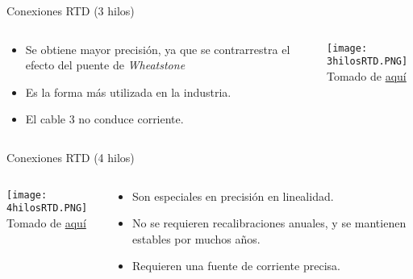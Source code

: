 \documentclass[aspectratio=169]{beamer}
\begin{document}
\begin{frame}{Conexiones RTD (3 hilos)}
    \begin{columns}[c, onlytextwidth]
    \begin{column}{0.55\textwidth}
            \begin{itemize}
                \item Se obtiene mayor precisión, ya que se contrarrestra el efecto del puente de \textit{Wheatstone}     
                \item Es la forma más utilizada en la industria.
                \item El cable 3 no conduce corriente.
            \end{itemize}
        \end{column}
        \begin{column}{0.45\textwidth}
        \texttt{[image: 3hilosRTD.PNG]}
            \\ \tiny{Tomado de \href{http://www.bearingsensor.com/bearing-rtd.html}{aquí}}
            
        \end{column}
        
    \end{columns}
\end{frame}
\begin{frame}{Conexiones RTD (4 hilos)}
    \begin{columns}[c, onlytextwidth]
        \begin{column}{0.45\textwidth}
        \texttt{[image: 4hilosRTD.PNG]}
            \\ \tiny{Tomado de \href{http://www.bearingsensor.com/bearing-rtd.html}{aquí}}
            
        \end{column}
    \begin{column}{0.55\textwidth}
            \begin{itemize}
                \item Son especiales en precisión en linealidad.      
                \item No se requieren recalibraciones anuales, y se mantienen estables por muchos años. 
                \item Requieren una fuente de corriente precisa. 
            \end{itemize}
        \end{column}
        
    \end{columns}
\end{frame}
\end{document}
